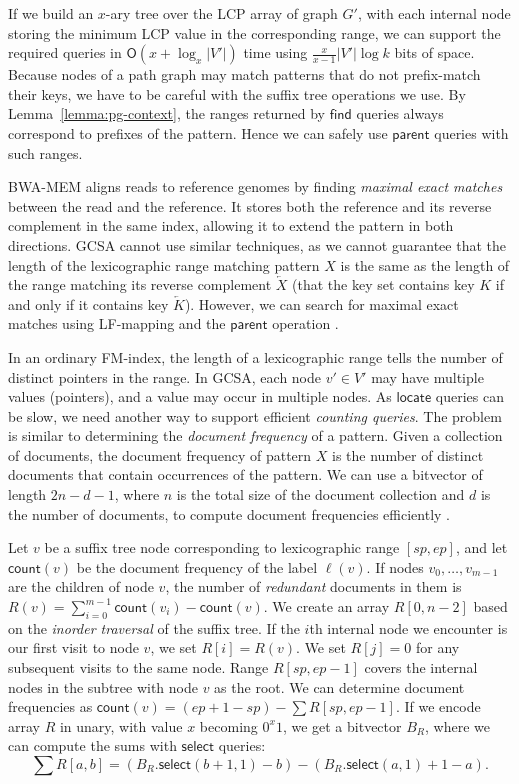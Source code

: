 \documentclass[a4paper,UKenglish]{lipics-v2016}
\newcommand{\abs}[1]{\ensuremath{\lvert #1 \rvert}}
\newcommand{\Oh}[1]{\ensuremath{\mathsf{O}\!\left( #1 \right)}}
\newcommand{\revcomp}[1]{\ensuremath{\overleftarrow{#1}}}
\newcommand{\select}{\ensuremath{\mathsf{select}}}
\newcommand{\find}{\ensuremath{\mathsf{find}}}
\newcommand{\locate}{\ensuremath{\mathsf{locate}}}
\newcommand{\parent}{\ensuremath{\mathsf{parent}}}
\newcommand{\countq}{\ensuremath{\mathsf{count}}}
\newcommand{\LFmapping}{LF\nobreakdash-mapping}
\begin{document}
If we build an $x$\nobreakdash-ary tree over the LCP array of graph $G'$, with each internal node storing the minimum LCP value in the corresponding range, we can support the required queries in $\Oh{x + \log_{x} \abs{V'}}$ time using $\frac{x}{x-1} \abs{V'} \log k$ bits of space. Because nodes of a path graph may match patterns that do not prefix-match their keys, we have to be careful with the suffix tree operations we use. By Lemma~\ref{lemma:pg-context}, the ranges returned by $\find$ queries always correspond to prefixes of the pattern. Hence we can safely use $\parent$ queries with such ranges.

BWA-MEM \cite{Li2013} aligns reads to reference genomes by finding \emph{maximal exact matches} between the read and the reference. It stores both the reference and its reverse complement in the same index, allowing it to extend the pattern in both directions. GCSA cannot use similar techniques, as we cannot guarantee that the length of the lexicographic range matching pattern $X$ is the same as the length of the range matching its reverse complement $\revcomp{X}$ (that the key set contains key $K$ if and only if it contains key $\revcomp{K}$). However, we can search for maximal exact matches using \LFmapping{} and the $\parent$ operation \cite{Ohlebusch2010a}.

In an ordinary FM\nobreakdash-index, the length of a lexicographic range tells the number of distinct pointers in the range. In GCSA, each node $v' \in V'$ may have multiple values (pointers), and a value may occur in multiple nodes. As $\locate$ queries can be slow, we need another way to support efficient \emph{counting queries}. The problem is similar to determining the \emph{document frequency} of a pattern. Given a collection of documents, the document frequency of pattern $X$ is the number of distinct documents that contain occurrences of the pattern. We can use a bitvector of length $2n-d-1$, where $n$ is the total size of the document collection and $d$ is the number of documents, to compute document frequencies efficiently \cite{Sadakane2007a}.

Let $v$ be a suffix tree node corresponding to lexicographic range $[sp, ep]$, and let $\countq(v)$ be the document frequency of the label $\ell(v)$. If nodes $v_{0}, \dotsc, v_{m-1}$ are the children of node $v$, the number of \emph{redundant} documents in them is $R(v) = \sum_{i=0}^{m-1} \countq(v_{i}) - \countq(v)$. We create an array $R[0, n-2]$ based on the \emph{inorder traversal} of the suffix tree. If the $i$th internal node we encounter is our first visit to node $v$, we set $R[i] = R(v)$. We set $R[j] = 0$ for any subsequent visits to the same node. Range $R[sp, ep-1]$ covers the internal nodes in the subtree with node $v$ as the root. We can determine document frequencies as $\countq(v) = (ep+1-sp) - \sum R[sp, ep-1]$. If we encode array $R$ in unary, with value $x$ becoming $0^{x} 1$, we get a bitvector $B_{R}$, where we can compute the sums with $\select$ queries:
$$
\sum R[a, b] = (B_{R}.\select(b+1, 1) - b) - (B_{R}.\select(a, 1) + 1 - a).
$$
\end{document}
